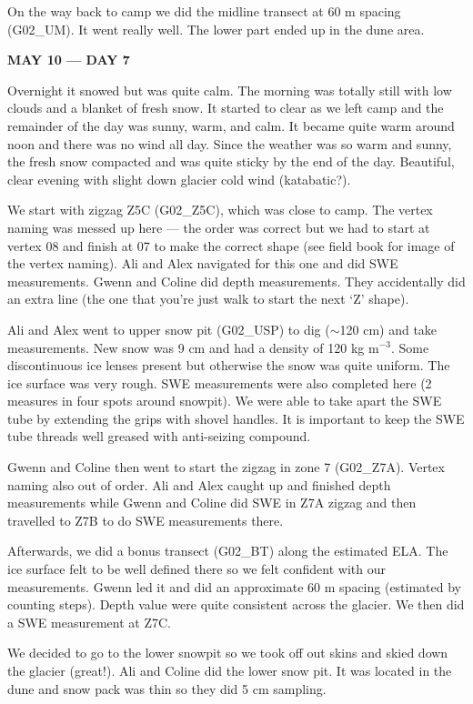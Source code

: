 \documentclass[12pt]{article}
\begin{document}
On the way back to camp we did the midline transect at 60 m spacing (G02\_UM). It went really well. The lower part ended up in the dune area. 

\vspace{4mm}
\noindent \textbf{MAY 10 --- DAY 7}

Overnight it snowed but was quite calm. The morning was totally still with low clouds and a blanket of fresh snow. It started to clear as we left camp and the remainder of the day was sunny, warm, and calm. It became quite warm around noon and there was no wind all day. Since the weather was so warm and sunny, the fresh snow compacted and was quite sticky by the end of the day. Beautiful, clear evening with slight down glacier cold wind (katabatic?).

We start with zigzag Z5C (G02\_Z5C), which was close to camp. The vertex naming was messed up here --- the order was correct but we had to start at vertex 08 and finish at 07 to make the correct shape (see field book for image of the vertex naming). Ali and Alex navigated for this one and did SWE measurements. Gwenn and Coline did depth measurements. They accidentally did an extra line (the one that you're just walk to start the next `Z' shape). 

Ali and Alex went to upper snow pit (G02\_USP) to dig ($\sim$120 cm) and take measurements. New snow was 9 cm and had a density of 120 kg m$^{-3}$. Some discontinuous ice lenses present but otherwise the snow was quite uniform. The ice surface was very rough. SWE measurements were also completed here (2 measures in four spots around snowpit). We were able to take apart the SWE tube by extending the grips with shovel handles. It is important to keep the SWE tube threads well greased with anti-seizing compound.

Gwenn and Coline then went to start the zigzag in zone 7 (G02\_Z7A). Vertex naming also out of order. Ali and Alex caught up and finished depth measurements while Gwenn and Coline did SWE in Z7A zigzag and then travelled to Z7B to do SWE measurements there. 

Afterwards, we did a bonus transect (G02\_BT) along the estimated ELA. The ice surface felt to be well defined there so we felt confident with our measurements. Gwenn led it and did an approximate 60 m spacing (estimated by counting steps). Depth value were quite consistent across the glacier. We then did a SWE measurement at Z7C.

We decided to go to the lower snowpit so we took off out skins and skied down the glacier (great!). Ali and Coline did the lower snow pit. It was located in the dune and snow pack was thin so they did 5 cm sampling. 
\end{document}
